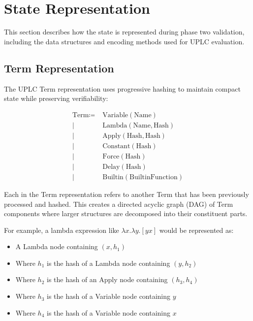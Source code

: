 \documentclass[../midgard.tex]{subfiles}
\begin{document}
\section{State Representation}
\label{s:phase-two-state-representation}

This section describes how the state is represented during phase two validation, including the data structures and encoding methods used for UPLC evaluation.

\subsection{Term Representation}

The UPLC Term representation uses progressive hashing to maintain compact state while preserving verifiability:

\begin{align*}
    \text{Term} \coloneq&\;
        \text{Variable} (\text{Name}) \\\mid&\;
        \text{Lambda} (\text{Name}, \text{Hash}) \\\mid&\;
        \text{Apply} (\text{Hash}, \text{Hash}) \\\mid&\;
        \text{Constant} (\text{Hash}) \\\mid&\;
        \text{Force} (\text{Hash}) \\\mid&\;
        \text{Delay} (\text{Hash}) \\\mid&\;
        \text{Builtin} (\text{BuiltinFunction})
\end{align*}

Each  in the Term representation refers to another Term that has been previously processed and hashed. This creates a directed acyclic graph (DAG) of Term components where larger structures are decomposed into their constituent parts.

For example, a lambda expression like \(\lambda x.\lambda y.[y x]\) would be represented as:
\begin{itemize}
    \item A Lambda node containing \((x, h_1)\)
    \item Where \(h_1\) is the hash of a Lambda node containing \((y, h_2)\)
    \item Where \(h_2\) is the hash of an Apply node containing \((h_3, h_4)\)
    \item Where \(h_3\) is the hash of a Variable node containing \(y\)
    \item Where \(h_4\) is the hash of a Variable node containing \(x\)
\end{itemize}
\end{document}
